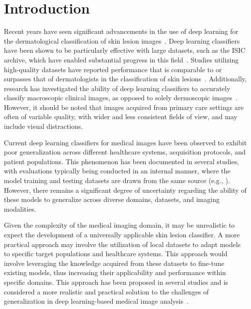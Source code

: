 \section{Introduction}
\label{sec:generalisation_intro}
Recent years have seen significant advancements in the use of deep learning for the dermatological classification of skin lesion images~\citep{du2020ai,wu2022skin}. Deep learning classifiers have been shown to be particularly effective with large datasets, such as the ISIC archive, which have enabled substantial progress in this field~\citep{tschandl2018ham10000,wen2021characteristics}. Studies utilizing high-quality datasets have reported performance that is comparable to or surpasses that of dermatologists in the classification of skin lesions~\citep{esteva2017dermatologist,haenssle2018man,han2018classification,tschandl2019expert}. Additionally, research has investigated the ability of deep learning classifiers to accurately classify macroscopic clinical images, as opposed to solely dermoscopic images~\citep{fujisawa2019deep}. However, it should be noted that images acquired from primary care settings are often of variable quality, with wider and less consistent fields of view, and may include visual distractions.

Current deep learning classifiers for medical images have been observed to exhibit poor generalization across different healthcare systems, acquisition protocols, and patient populations. This phenomenon has been documented in several studies, with evaluations typically being conducted in an internal manner, where the model training and testing datasets are drawn from the same source (e.g., \cite{han2018classification}). However, there remains a significant degree of uncertainty regarding the ability of these models to generalize across diverse domains, datasets, and imaging modalities. 

Given the complexity of the medical imaging domain, it may be unrealistic to expect the development of a universally applicable skin lesion classifier. A more practical approach may involve the utilization of local datasets to adapt models to specific target populations and healthcare systems. This approach would involve leveraging the knowledge acquired from these datasets to fine-tune existing models, thus increasing their applicability and performance within specific domains. This approach has been proposed in several studies and is considered a more realistic and practical solution to the challenges of generalization in deep learning-based medical image analysis~\citep{glocker2022risk}. 

